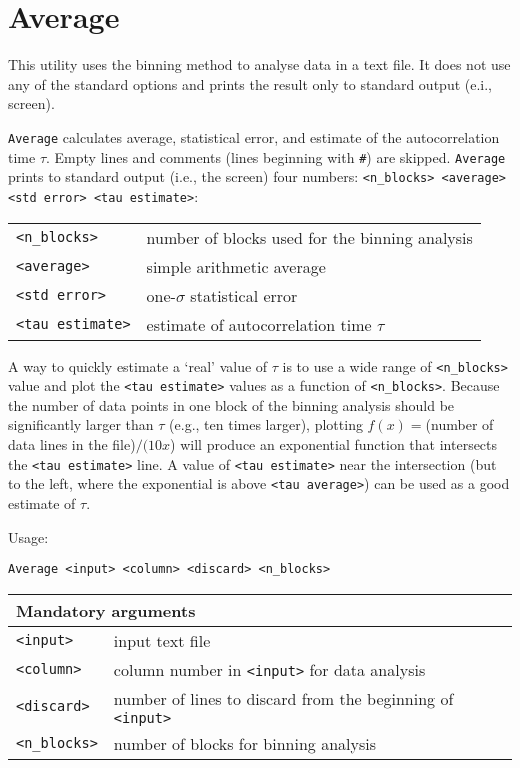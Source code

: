 \section{Average} \label{sec:Average}

This utility uses the binning method to analyse data in a text file. It
does not use any of the standard options and prints the result only to
standard output (e.i., screen).

\texttt{Average} calculates average, statistical error, and estimate of the
autocorrelation time $\tau$. Empty lines and comments (lines beginning with
\texttt{\#}) are skipped. \texttt{Average} prints to standard output (i.e.,
the screen) four numbers: \texttt{<n\_blocks> <average> <std error> <tau
estimate>}:
\begin{longtable}{ll}
  \toprule
  \texttt{<n\_blocks>} & number of blocks used for the binning analysis \\
  \texttt{<average>} & simple arithmetic average \\
  \texttt{<std error>} & one-$\sigma$ statistical error \\
  \texttt{<tau estimate>} & estimate of autocorrelation time $\tau$ \\
  \bottomrule
\end{longtable}

A way to quickly estimate a `real' value of $\tau$ is to use a wide range
of \texttt{<n\_blocks>} value and plot the \texttt{<tau estimate>} values
as a function of \texttt{<n\_blocks>}. Because the number of data points in
one block of the binning analysis should be significantly larger than
$\tau$ (e.g., ten times larger), plotting $f(x)=$(number of data lines in
the file)$/(10x$) will produce an exponential function that intersects the
\texttt{<tau estimate>} line. A value of \texttt{<tau estimate>} near the
intersection (but to the left, where the exponential is above \texttt{<tau
average>}) can be used as a good estimate of $\tau$.

Usage:

\vspace{1em}
\noindent
\texttt{Average <input> <column> <discard> <n\_blocks>}

\noindent
\begin{longtable}{p{}p{}}
  \toprule
  \multicolumn{2}{l}{Mandatory arguments} \\
  \midrule
  \texttt{<input>} & input text file \\
  \texttt{<column>} & column number in \texttt{<input>} for data analysis \\
  \texttt{<discard>} & number of lines to discard from the beginning of
    \texttt{<input>} \\
  \texttt{<n\_blocks>} & number of blocks for binning analysis \\
  \bottomrule
\end{longtable}

